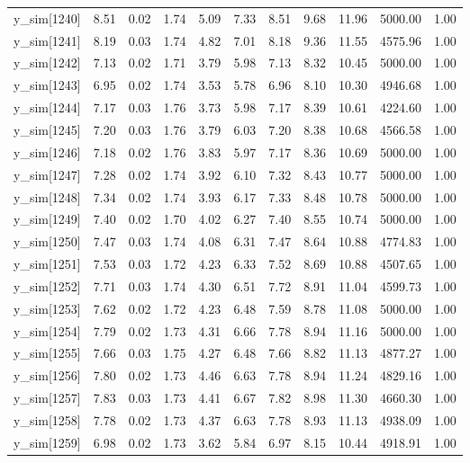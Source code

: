 \begin{table}[ht]
\begin{tabular}{rrrrrrrrrrr}
  y\_sim[1240] & 8.51 & 0.02 & 1.74 & 5.09 & 7.33 & 8.51 & 9.68 & 11.96 & 5000.00 & 1.00 \\ 
  y\_sim[1241] & 8.19 & 0.03 & 1.74 & 4.82 & 7.01 & 8.18 & 9.36 & 11.55 & 4575.96 & 1.00 \\ 
  y\_sim[1242] & 7.13 & 0.02 & 1.71 & 3.79 & 5.98 & 7.13 & 8.32 & 10.45 & 5000.00 & 1.00 \\ 
  y\_sim[1243] & 6.95 & 0.02 & 1.74 & 3.53 & 5.78 & 6.96 & 8.10 & 10.30 & 4946.68 & 1.00 \\ 
  y\_sim[1244] & 7.17 & 0.03 & 1.76 & 3.73 & 5.98 & 7.17 & 8.39 & 10.61 & 4224.60 & 1.00 \\ 
  y\_sim[1245] & 7.20 & 0.03 & 1.76 & 3.79 & 6.03 & 7.20 & 8.38 & 10.68 & 4566.58 & 1.00 \\ 
  y\_sim[1246] & 7.18 & 0.02 & 1.76 & 3.83 & 5.97 & 7.17 & 8.36 & 10.69 & 5000.00 & 1.00 \\ 
  y\_sim[1247] & 7.28 & 0.02 & 1.74 & 3.92 & 6.10 & 7.32 & 8.43 & 10.77 & 5000.00 & 1.00 \\ 
  y\_sim[1248] & 7.34 & 0.02 & 1.74 & 3.93 & 6.17 & 7.33 & 8.48 & 10.78 & 5000.00 & 1.00 \\ 
  y\_sim[1249] & 7.40 & 0.02 & 1.70 & 4.02 & 6.27 & 7.40 & 8.55 & 10.74 & 5000.00 & 1.00 \\ 
  y\_sim[1250] & 7.47 & 0.03 & 1.74 & 4.08 & 6.31 & 7.47 & 8.64 & 10.88 & 4774.83 & 1.00 \\ 
  y\_sim[1251] & 7.53 & 0.03 & 1.72 & 4.23 & 6.33 & 7.52 & 8.69 & 10.88 & 4507.65 & 1.00 \\ 
  y\_sim[1252] & 7.71 & 0.03 & 1.74 & 4.30 & 6.51 & 7.72 & 8.91 & 11.04 & 4599.73 & 1.00 \\ 
  y\_sim[1253] & 7.62 & 0.02 & 1.72 & 4.23 & 6.48 & 7.59 & 8.78 & 11.08 & 5000.00 & 1.00 \\ 
  y\_sim[1254] & 7.79 & 0.02 & 1.73 & 4.31 & 6.66 & 7.78 & 8.94 & 11.16 & 5000.00 & 1.00 \\ 
  y\_sim[1255] & 7.66 & 0.03 & 1.75 & 4.27 & 6.48 & 7.66 & 8.82 & 11.13 & 4877.27 & 1.00 \\ 
  y\_sim[1256] & 7.80 & 0.02 & 1.73 & 4.46 & 6.63 & 7.78 & 8.94 & 11.24 & 4829.16 & 1.00 \\ 
  y\_sim[1257] & 7.83 & 0.03 & 1.73 & 4.41 & 6.67 & 7.82 & 8.98 & 11.30 & 4660.30 & 1.00 \\ 
  y\_sim[1258] & 7.78 & 0.02 & 1.73 & 4.37 & 6.63 & 7.78 & 8.93 & 11.13 & 4938.09 & 1.00 \\ 
  y\_sim[1259] & 6.98 & 0.02 & 1.73 & 3.62 & 5.84 & 6.97 & 8.15 & 10.44 & 4918.91 & 1.00 \\ 

\end{tabular}
\end{table}
